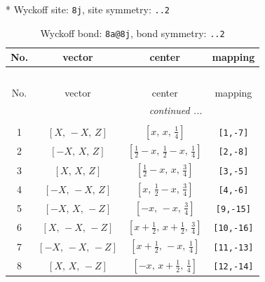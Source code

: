 \documentclass[fleqn,8pt]{jsarticle}
\begin{document}
* Wyckoff site: {\tt 8j}, site symmetry: {\tt ..2}
\renewcommand{\arraystretch}{1.2}
\begin{longtable}{cccc}
\caption{Wyckoff bond: {\tt 8a@8j}, bond symmetry: {\tt ..2}}
 \\
 \hline \hline
No. & vector & center & mapping \\ \hline \endfirsthead

\multicolumn{3}{l}{\tablename\ \thetable{}} \\
 \hline \hline
No. & vector & center & mapping \\ \hline \endhead

 \hline \hline
\multicolumn{3}{r}{\footnotesize\it continued ...} \\ \endfoot

 \hline \hline
\multicolumn{3}{r}{} \\ \endlastfoot

1 & $\left[ X,\, - X,\, Z \right]$ & $\left[ x,\, x,\, \frac{1}{4} \right]$ & {\tt [1,-7]} \\ \hline
2 & $\left[ - X,\, X,\, Z \right]$ & $\left[ \frac{1}{2} - x,\, \frac{1}{2} - x,\, \frac{1}{4} \right]$ & {\tt [2,-8]} \\ \hline
3 & $\left[ X,\, X,\, Z \right]$ & $\left[ \frac{1}{2} - x,\, x,\, \frac{3}{4} \right]$ & {\tt [3,-5]} \\ \hline
4 & $\left[ - X,\, - X,\, Z \right]$ & $\left[ x,\, \frac{1}{2} - x,\, \frac{3}{4} \right]$ & {\tt [4,-6]} \\ \hline
5 & $\left[ - X,\, X,\, - Z \right]$ & $\left[ - x,\, - x,\, \frac{3}{4} \right]$ & {\tt [9,-15]} \\ \hline
6 & $\left[ X,\, - X,\, - Z \right]$ & $\left[ x + \frac{1}{2},\, x + \frac{1}{2},\, \frac{3}{4} \right]$ & {\tt [10,-16]} \\ \hline
7 & $\left[ - X,\, - X,\, - Z \right]$ & $\left[ x + \frac{1}{2},\, - x,\, \frac{1}{4} \right]$ & {\tt [11,-13]} \\ \hline
8 & $\left[ X,\, X,\, - Z \right]$ & $\left[ - x,\, x + \frac{1}{2},\, \frac{1}{4} \right]$ & {\tt [12,-14]} \\
\end{longtable}
\renewcommand{\arraystretch}{1.2}
\end{document}
